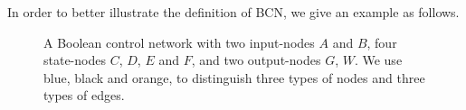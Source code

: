 In order to better illustrate the definition of BCN, we give an example as follows.


 
 \begin{figure}[thpb]
      \centering
      
      \caption{A Boolean control network with two input-nodes $A$ and $B$, four state-nodes $C$, $D$, $E$ and $F$, and two output-nodes $G$, $W$. We use blue, black and orange, to distinguish three types of nodes and three types of edges.}
      \label{fig:1}
  \end{figure}


